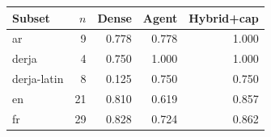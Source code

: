 \begin{tabular}{@{}lrrrr@{}}
\toprule
Subset & $n$ & Dense & Agent & Hybrid+cap \\
\midrule
ar & 9 & 0.778 & 0.778 & 1.000 \\
derja & 4 & 0.750 & 1.000 & 1.000 \\
derja-latin & 8 & 0.125 & 0.750 & 0.750 \\
en & 21 & 0.810 & 0.619 & 0.857 \\
fr & 29 & 0.828 & 0.724 & 0.862 \\
\bottomrule
\end{tabular}